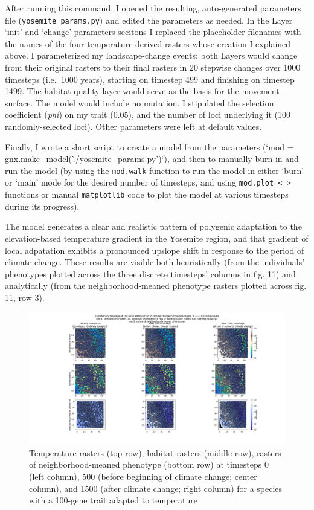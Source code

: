 ﻿\documentclass{article}
\begin{document}
After running this command, I opened the resulting, auto-generated parameters
file (\texttt{yosemite\_params.py}) and edited the parameters as needed. In the Layer
`init' and `change' parameters secitons I replaced
the placeholder filenames with the names of the four temperature-derived
rasters whose creation I explained above. I parameterized my landscape-change
events: both Layers would change from their original rasters to their final
rasters in 20 stepwise changes over 1000 timesteps (i.e.\ 1000 years),
starting on timestep 499 and finishing on timestep 1499. The habitat-quality
layer would serve as the basis for the movement-surface. The model would include
no mutation. I stipulated the selection coefficient (\emph{phi}) on my trait
(0.05), and the number of loci underlying it (100 randomly-selected loci).
Other parameters were left at default values.

Finally, I wrote a short script to create a model from the parameters 
(`mod = gnx.make\_model('./yosemite\_params.py')`), and then to manually
burn in and run the model (by using the \texttt{mod.walk} function to run the model
in either `burn' or `main' mode for the desired number of timesteps, and using
\texttt{mod.plot\_<\_>} functions or manual \texttt{matplotlib} code
to plot the model at various timesteps during its progress).

The model generates a clear and realistic pattern of polygenic adaptation to
the elevation-based temperature gradient in the Yosemite region, and that
gradient of local adpatation exhibits a pronounced upslope shift in response to
the period of climate change. These results are visible both heuristically
(from the individuals' phenotypes plotted across the three discrete timesteps'
columns in fig. 11) and analytically (from the neighborhood-meaned phenotype
rasters plotted across fig. 11, row 3).

\begin{figure}[h!]
\includegraphics[width=175mm]{./img/example/yosemite_results.png}
        \caption{Temperature rasters (top row), habitat rasters (middle row), rasters of neighborhood-meaned phenotype (bottom row) at timesteps 0 (left column), 500 (before beginning of climate change; center column), and 1500 (after climate change; right column) for a species with a 100-gene trait adapted to temperature}
\end{figure}
\end{document}
